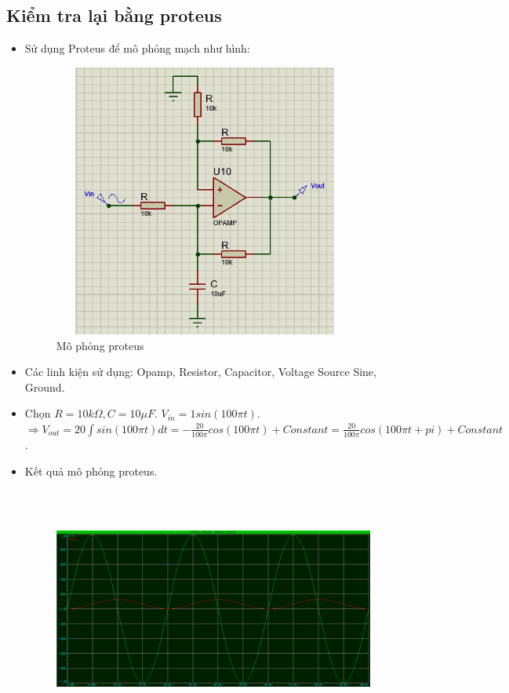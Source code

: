         \subsection{Kiểm tra lại bằng proteus}
            \begin{itemize}
                \item Sử dụng Proteus để mô phỏng mạch như hình: 
                \begin{figure}[H]
                    \centering
                    \includegraphics[width=100mm, height=90mm]{pictures/result2_b_1.png}
                    \caption{Mô phỏng proteus}					
                \end{figure}
                \item Các linh kiện sử dụng: Opamp, Resistor, Capacitor, Voltage Source Sine, Ground.
                \item Chọn $R = 10k\Omega, C = 10\mu F$. $V_{in} = 1sin(100\pi t)$. \\
                $\Rightarrow V_{out} = 20\int sin(100\pi t) dt = -\frac{20}{100\pi}cos(100\pi t) + Constant = \frac{20}{100\pi}cos(100\pi t+ pi) + Constant$.
                \item Kết quả mô phỏng proteus.
                \begin{figure}[H]
                    \centering
                    \includegraphics[width=110mm, height=80mm]{pictures/result2_b_2.png}

\end{figure}
\end{itemize}
